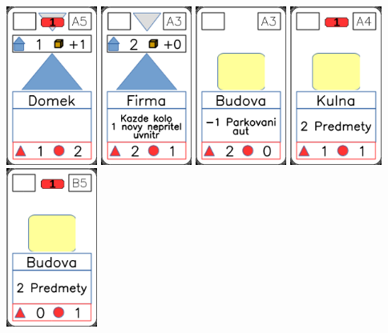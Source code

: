 \documentclass[a4paper]{article}
\begin{document}
	\includegraphics[width=3.0cm]{img-3_4}
	\includegraphics[width=3.0cm]{img-3_17}
	\includegraphics[width=3.0cm]{img-2_2}
	\includegraphics[width=3.0cm]{img-2_18}
	\includegraphics[width=3.0cm]{img-2_9}
\end{document}
